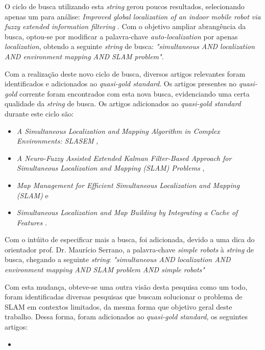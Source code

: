 		O ciclo de busca utilizando esta \textit{string} gerou poucos resultados, selecionando apenas um para análise: \textit{Improved global localization of an indoor mobile robot via fuzzy extended information filtering} \cite{ROB:1764504}. Com o objetivo ampliar abrangência da busca, optou-se por modificar a palavra-chave \textit{auto-localization} por apenas \textit{localization}, obtendo a seguinte \textit{string} de busca: \textit{"simultaneous AND localization AND environment mapping AND SLAM problem"}.

		Com a realização deste novo ciclo de busca, diversos artigos relevantes foram identificados e adicionados ao \textit{quasi-gold standard}. Os artigos presentes no \textit{quasi-gold} corrente foram encontrados com esta nova busca, evidenciando uma certa qualidade da \textit{string} de busca. Os artigos adicionados ao \textit{quasi-gold standard} durante este ciclo são:

		\begin{itemize}
			\item \textit{A Simultaneous Localization and Mapping Algorithm in Complex Environments: SLASEM} \cite{slasem},
			\item \textit{A Neuro-Fuzzy Assisted Extended Kalman Filter-Based Approach for Simultaneous Localization  and  Mapping (SLAM) Problems} \cite{neurofuzzi},
			\item \textit{Map Management for Efficient Simultaneous Localization and Mapping (SLAM)} \cite{mapManagement} e
			\item \textit{Simultaneous Localization and Map Building by Integrating a Cache of Features} \cite{integratingCacheFeat}.
		\end{itemize}

		Com o intúito de especificar mais a busca, foi adicionada, devido a uma dica do orientador prof. Dr. Maurício Serrano, a palavra-chave \textit{simple robots} à \textit{string} de busca, chegando a seguinte \textit{string}: \textit{"simultaneous AND localization AND environment mapping AND SLAM problem AND simple robots"}

		Com esta mudança, obteve-se uma outra visão desta pesquisa como um todo, foram identificadas diversas pesquisas que buscam solucionar o problema de SLAM em contextos limitados, da mesma forma que objetivo geral deste trabalho. Dessa forma, foram adicionados ao \textit{quasi-gold standard}, os seguintes artigos:

		\begin{itemize}
			\item \textit{}
		\end{itemize}

